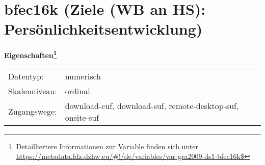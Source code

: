 
    \setcounter{footnote}{0}

    \vspace*{-1.8cm}
	\section{bfec16k (Ziele (WB an HS): Persönlichkeitsentwicklung)}
	\label{section:bfec16k}



    \vspace*{0.5cm}
    \noindent\textbf{Eigenschaften\footnote{Detailliertere Informationen zur Variable finden sich unter
		\url{https://metadata.fdz.dzhw.eu/\#!/de/variables/var-gra2009-ds1-bfec16k$}}}\\
	\begin{tabularx}{\hsize}{@{}lX}
	Datentyp: & numerisch \\
	Skalenniveau: & ordinal \\
	Zugangswege: &
	  download-cuf, 
	  download-suf, 
	  remote-desktop-suf, 
	  onsite-suf
 \\
    \end{tabularx}



